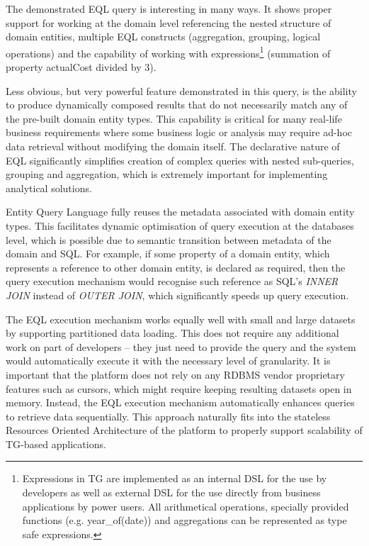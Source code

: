   The demonstrated EQL query is interesting in many ways.
  It shows proper support for working at the domain level referencing the nested structure of domain entities, multiple EQL constructs (aggregation, grouping, logical operations) and the capability of working with expressions\footnote{
    Expressions in TG are implemented as an internal DSL for the use by developers as well as external DSL for the use directly from business applications by power users. 
    All arithmetical operations, specially provided functions (e.g. year\_of(date)) and aggregations can be represented as type safe expressions.
  }
  (summation of property actualCost divided by 3).  
  
  Less obvious, but very powerful feature demonstrated in this query, is the ability to produce dynamically composed results that do not necessarily match any of the pre-built domain entity types.
  This capability is critical for many real-life business requirements where some business logic or analysis may require ad-hoc data retrieval without modifying the domain itself.
  The declarative nature of EQL significantly simplifies creation of complex queries with nested sub-queries, grouping and aggregation, which is extremely important for implementing analytical solutions.  

  Entity Query Language fully reuses the metadata associated with domain entity types.
  This facilitates dynamic optimisation of query execution at the databases level, which is possible due to semantic transition between metadata of the domain and SQL.
  For example, if some property of a domain entity, which represents a reference to other domain entity, is declared as required, then the query execution mechanism would recognise such reference as SQL's \emph{INNER JOIN} instead of \emph{OUTER JOIN}, which significantly speeds up query execution.

  The EQL execution mechanism works equally well with small and large datasets by supporting partitioned data loading.
  This does not require any additional work on part of developers -- they just need to provide the query and the system would automatically execute it with the necessary level of granularity.
  It is important that the platform does not rely on any RDBMS vendor proprietary features such as cursors, which might require keeping resulting datasets open in memory.
  Instead, the EQL execution mechanism automatically enhances queries to retrieve data sequentially.
  This approach naturally fits into the stateless Resources Oriented Architecture of the platform to properly support scalability of TG-based applications.

